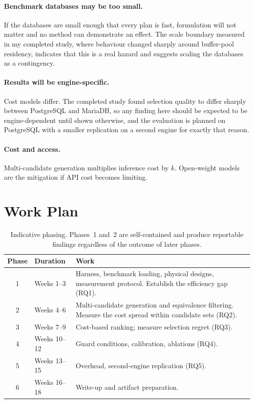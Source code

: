 \documentclass[12pt, a4paper]{article}
\begin{document}
\paragraph{Benchmark databases may be too small.}
If the databases are small enough that every plan is fast, formulation
will not matter and no method can demonstrate an effect. The scale
boundary measured in my completed study, where behaviour changed sharply
around buffer-pool residency, indicates that this is a real hazard and
suggests scaling the databases as a contingency.

\paragraph{Results will be engine-specific.}
Cost models differ. The completed study found selection quality to
differ sharply between PostgreSQL and MariaDB, so any finding here
should be expected to be engine-dependent until shown otherwise, and
the evaluation is planned on PostgreSQL with a smaller replication on a
second engine for exactly that reason.

\paragraph{Cost and access.} Multi-candidate generation multiplies
inference cost by $k$. Open-weight models~\cite{li2024codes} are the
mitigation if API cost becomes limiting.

\section{Work Plan}
\label{sec:plan}

\begin{table}[htbp]
\centering
\caption{Indicative phasing. Phases~1 and~2 are self-contained and
produce reportable findings regardless of the outcome of later phases.}
\label{tab:timeline}
\small
\begin{tabular}{@{}clp{7.4cm}@{}}
\toprule
\textbf{Phase} & \textbf{Duration} & \textbf{Work} \\
\midrule
1 & Weeks 1--3 & Harness, benchmark loading, physical designs,
measurement protocol. Establish the efficiency gap (RQ1). \\
2 & Weeks 4--6 & Multi-candidate generation and equivalence filtering.
Measure the cost spread within candidate sets (RQ2). \\
3 & Weeks 7--9 & Cost-based ranking; measure selection regret (RQ3). \\
4 & Weeks 10--12 & Guard conditions, calibration, ablations (RQ4). \\
5 & Weeks 13--15 & Overhead, second-engine replication (RQ5). \\
6 & Weeks 16--18 & Write-up and artifact preparation. \\
\bottomrule
\end{tabular}
\end{table}
\end{document}
